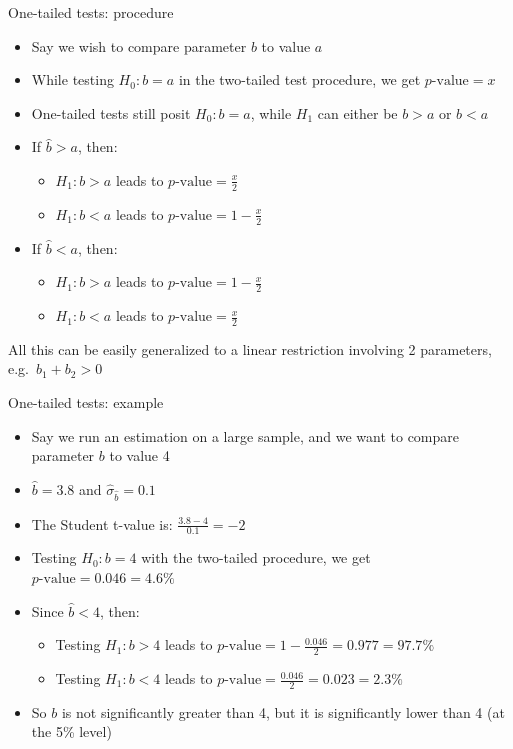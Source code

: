 \documentclass[aspectratio=169]{beamer}
\begin{document}
\begin{frame}{One-tailed tests: procedure}
\begin{itemize}
    \item Say we wish to compare parameter $b$ to value $a$
    \item While testing $H_0: b = a$ in the two-tailed test procedure, we get $p\text{-value} = x$
    \item One-tailed tests still posit $H_0: b = a$, while $H_1$ can either be $b > a$ or $b < a$
    \item If $\hat{b} > a$, then:
    \begin{itemize}
        \item $H_1: b > a$ leads to $p\text{-value} = \frac{x}{2}$
        \item $H_1: b < a$ leads to $p\text{-value} = 1 - \frac{x}{2}$
    \end{itemize}
    \item If $\hat{b} < a$, then:
    \begin{itemize}
        \item $H_1: b > a$ leads to $p\text{-value} = 1 - \frac{x}{2}$
        \item $H_1: b < a$ leads to $p\text{-value} = \frac{x}{2}$
    \end{itemize}
\end{itemize}

All this can be easily generalized to a linear restriction involving 2 parameters, e.g.\ $b_1 + b_2 > 0$
\end{frame}

\begin{frame}{One-tailed tests: example}
\begin{itemize}
    \item Say we run an estimation on a large sample, and we want to compare parameter $b$ to value 4
    \item $\hat{b} = 3.8$ and $\hat{\sigma}_{\hat{b}} = 0.1$
    \item The Student t-value is: $\frac{3.8-4}{0.1} = -2$
    \item Testing $H_0: b = 4$ with the two-tailed procedure, we get $p\text{-value} = 0.046 = 4.6\%$
    \item Since $\hat{b} < 4$, then:
    \begin{itemize}
        \item Testing $H_1: b > 4$ leads to $p\text{-value} = 1 - \frac{0.046}{2} = 0.977 = 97.7\%$
        \item Testing $H_1: b < 4$ leads to $p\text{-value} = \frac{0.046}{2} = 0.023 = 2.3\%$
    \end{itemize}
    \item So $b$ is not significantly greater than 4, but it is significantly lower than 4 (at the 5\% level)
\end{itemize}
\end{frame}
\end{document}
